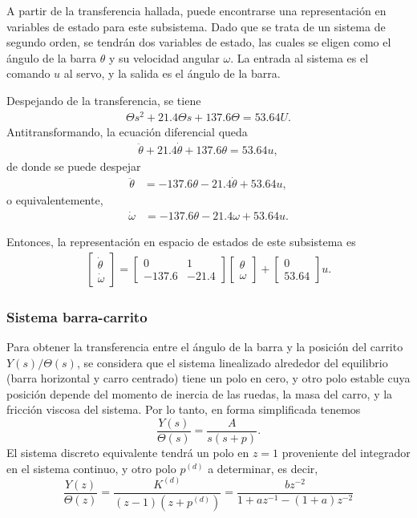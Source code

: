 A partir de la transferencia hallada, puede encontrarse una representación en variables de estado para este subsistema. Dado que se trata de un sistema de segundo orden, se tendrán dos variables de estado, las cuales se eligen como el ángulo de la barra $\theta$ y su velocidad angular $\omega$. La entrada al sistema es el comando $u$ al servo, y la salida es el ángulo de la barra.

Despejando de la transferencia, se tiene
\begin{align*}
    \Theta s^2 + 21.4 \Theta s + 137.6 \Theta = 53.64 U.
\end{align*}
Antitransformando, la ecuación diferencial queda
\begin{align*}
    \ddot{\theta} + 21.4 \dot{\theta} + 137.6 \theta = 53.64 u,
\end{align*}
de donde se puede despejar
\begin{align*}
    \ddot{\theta} &= -137.6 \theta - 21.4 \dot{\theta} + 53.64 u,
\end{align*}
o equivalentemente,
\begin{align*}
    \dot{\omega} &= -137.6 \theta - 21.4 \omega + 53.64 u.
\end{align*}

Entonces, la representación en espacio de estados de este subsistema es
\begin{align*}
    \begin{bmatrix} \dot{\theta} \\ \dot{\omega} \end{bmatrix} =
        \begin{bmatrix} 0 & 1 \\ -137.6 & -21.4 \end{bmatrix} \begin{bmatrix} \theta \\ \omega \end{bmatrix}
        + \begin{bmatrix} 0 \\ 53.64 \end{bmatrix} u.
\end{align*}

\subsubsection{Sistema barra-carrito}

Para obtener la transferencia entre el ángulo de la barra y la posición del carrito $Y(s) / \Theta(s)$, se considera que el sistema linealizado alrededor del equilibrio (barra horizontal y carro centrado) tiene un polo en cero, y otro polo estable cuya posición depende del momento de inercia de las ruedas, la masa del carro, y la fricción viscosa del sistema. Por lo tanto, en forma simplificada tenemos
\[
    \frac{Y(s)}{\Theta(s)} = \frac{A}{s(s+p)}.
\]
El sistema discreto equivalente tendrá un polo en $z = 1$ proveniente del integrador en el sistema continuo, y otro polo $p^{(d)}$ a determinar, es decir,
\[
    \frac{Y(z)}{\Theta(z)} = \frac{K^{(d)}}{(z-1)(z+p^{(d)})} = \frac{b z^{-2}}{1 + a z^{-1} - (1+a) z^{-2}}
\]

